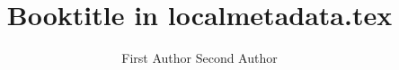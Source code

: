 \title{Booktitle in localmetadata.tex}
\author{First Author \lastand Second Author}
\renewcommand{\lsSeries}{sidl}%
\renewcommand{\lsSeriesNumber}{}
